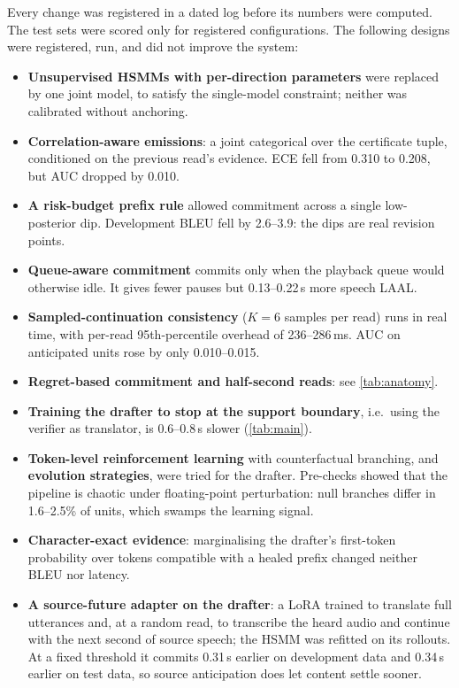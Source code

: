 Every change was registered in a dated log before its numbers were computed.
The test sets were scored only for registered configurations.
The following designs were registered, run, and did not improve the system:
\begin{itemize}[leftmargin=*,itemsep=1pt]
  \item \textbf{Unsupervised HSMMs with per-direction parameters} were replaced by one joint model, to satisfy the single-model constraint; neither was calibrated without anchoring.
  \item \textbf{Correlation-aware emissions}: a joint categorical over the certificate tuple, conditioned on the previous read's evidence. ECE fell from 0.310 to 0.208, but AUC dropped by 0.010.
  \item \textbf{A risk-budget prefix rule} allowed commitment across a single low-posterior dip. Development BLEU fell by 2.6--3.9: the dips are real revision points.
  \item \textbf{Queue-aware commitment} commits only when the playback queue would otherwise idle. It gives fewer pauses but 0.13--0.22\,s more speech LAAL.
  \item \textbf{Sampled-continuation consistency} ($K = 6$ samples per read) runs in real time, with per-read 95th-percentile overhead of 236--286\,ms. AUC on anticipated units rose by only 0.010--0.015.
  \item \textbf{Regret-based commitment and half-second reads}: see \cref{tab:anatomy}.
  \item \textbf{Training the drafter to stop at the support boundary}, i.e.\ using the verifier as translator, is 0.6--0.8\,s slower (\cref{tab:main}).
  \item \textbf{Token-level reinforcement learning} with counterfactual branching, and \textbf{evolution strategies}, were tried for the drafter. Pre-checks showed that the pipeline is chaotic under floating-point perturbation: null branches differ in 1.6--2.5\% of units, which swamps the learning signal.
  \item \textbf{Character-exact evidence}: marginalising the drafter's first-token probability over tokens compatible with a healed prefix changed neither BLEU nor latency.
  \item \textbf{A source-future adapter on the drafter}: a LoRA trained to translate full utterances and, at a random read, to transcribe the heard audio and continue with the next second of source speech; the HSMM was refitted on its rollouts.
  At a fixed threshold it commits 0.31\,s earlier on development data and 0.34\,s earlier on test data, so source anticipation does let content settle sooner.

\end{itemize}
